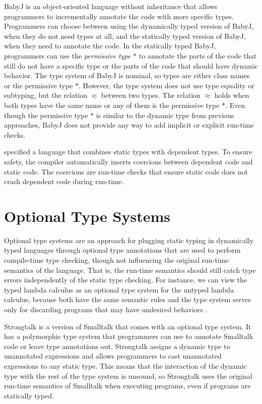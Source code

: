 BabyJ \citep{anderson2003babyj} is an object-oriented language
without inheritance that allows programmers to incrementally annotate
the code with more specific types.
Programmers can choose between using the dynamically typed version
of BabyJ, when they do not need types at all, and the statically
typed version of BabyJ, when they need to annotate the code.
In the statically typed BabyJ, programmers can use the
\emph{permissive type} $*$ to annotate the parts of the code that
still do not have a specific type or the parts of the code that should
have dynamic behavior.
The type system of BabyJ is nominal, so types are either class names
or the permissive type $*$.
However, the type system does not use type equality or subtyping,
but the relation $\approx$ between two types.
The relation $\approx$ holds when both types have the same name or
any of them is the permissive type $*$.
Even though the permissive type $*$ is similar to the dynamic type
from previous approaches, BabyJ does not provide any way to add
implicit or explicit run-time checks.

\citet{ou2004dtd} specified a language that combines static types
with dependent types.
To ensure safety, the compiler automatically inserts coercions
between dependent code and static code.
The coercions are run-time checks that ensure static code does not
crash dependent code during run-time.

\section{Optional Type Systems}

Optional type systems \citep{bracha2004pluggable} are an approach for
plugging static typing in dynamically typed languages through
optional type annotations that are used to perform compile-time type
checking, though not influencing the original run-time semantics of
the language.
That is, the run-time semantics should still catch type errors
independently of the static type checking.
For instance, we can view the typed lambda calculus as an optional
type system for the untyped lambda calculus, because both have the
same semantic rules and the type system serves only for discarding
programs that may have undesired behaviors \citep{bracha2004pluggable}.

Strongtalk \citep{bracha1993strongtalk,bracha1996strongtalk} is
a version of Smalltalk that comes with an optional type system.
It has a polymorphic type system that programmers can use to annotate
Smalltalk code or leave type annotations out.
Strongtalk assigns a dynamic type to unannotated expressions and allows
programmers to cast unannotated expressions to any static type.
This means that the interaction of the dynamic type with the rest of
the type system is unsound, so Strongtalk uses the original run-time
semantics of Smalltalk when executing programs, even if programs are
statically typed.

